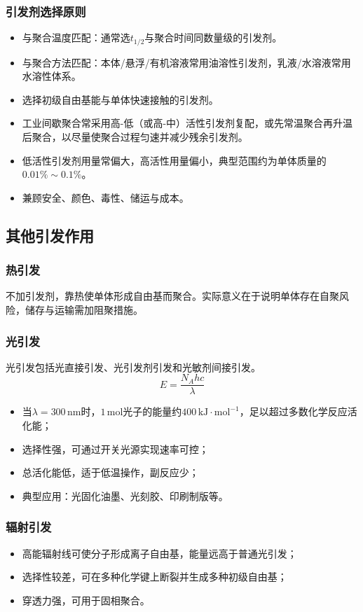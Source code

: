 ﻿\documentclass[12pt,a4paper]{article}
\begin{document}
\subsubsection{引发剂选择原则}
\begin{itemize}
  \item 与聚合温度匹配：通常选$t_{1/2}$与聚合时间同数量级的引发剂。
  \item 与聚合方法匹配：本体/悬浮/有机溶液常用油溶性引发剂，乳液/水溶液常用水溶性体系。
  \item 选择初级自由基能与单体快速接触的引发剂。
  \item 工业间歇聚合常采用高-低（或高-中）活性引发剂复配，或先常温聚合再升温后聚合，以尽量使聚合过程匀速并减少残余引发剂。
  \item 低活性引发剂用量常偏大，高活性用量偏小，典型范围约为单体质量的$0.01\%\sim0.1\%$。
  \item 兼顾安全、颜色、毒性、储运与成本。
\end{itemize}

\subsection{其他引发作用}
\subsubsection{热引发}
不加引发剂，靠热使单体形成自由基而聚合。实际意义在于说明单体存在自聚风险，储存与运输需加阻聚措施。

\subsubsection{光引发}
光引发包括光直接引发、光引发剂引发和光敏剂间接引发。
\[
E=\frac{N_Ahc}{\lambda}
\]
\begin{itemize}
  \item 当$\lambda=300\,\mathrm{nm}$时，$1\,\mathrm{mol}$光子的能量约$400\,\mathrm{kJ\cdot mol^{-1}}$，足以超过多数化学反应活化能；
  \item 选择性强，可通过开关光源实现速率可控；
  \item 总活化能低，适于低温操作，副反应少；
  \item 典型应用：光固化油墨、光刻胶、印刷制版等。
\end{itemize}

\subsubsection{辐射引发}
\begin{itemize}
  \item 高能辐射线可使分子形成离子自由基，能量远高于普通光引发；
  \item 选择性较差，可在多种化学键上断裂并生成多种初级自由基；
  \item 穿透力强，可用于固相聚合。
\end{itemize}
\end{document}
